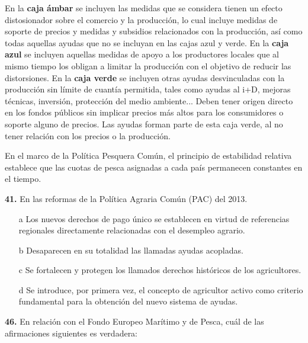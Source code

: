 \documentclass{nuevotema}
\begin{document}
En la \textbf{caja ámbar} se incluyen las medidas que se considera tienen un efecto distosionador sobre el comercio y la producción, lo cual incluye medidas de soporte de precios y medidas y subsidios relacionados con la producción, así como todas aquellas ayudas que no se incluyan en las cajas azul y verde. En la \textbf{caja azul} se incluyen aquellas medidas de apoyo a los productores locales que al mismo tiempo los obligan a limitar la producción con el objetivo de reducir las distorsiones. En la \textbf{caja verde} se incluyen otras ayudas desvinculadas con la producción sin límite de cuantía permitida, tales como ayudas al i+D, mejoras técnicas, inversión, protección del medio ambiente... Deben tener origen directo en los fondos públicos sin implicar precios más altos para los consumidores o soporte alguno de precios. Las ayudas  forman parte de esta caja verde, al no tener relación con los precios o la producción.


En el marco de la Política Pesquera Común, el principio de estabilidad relativa establece que las cuotas de pesca asignadas a cada país permanecen constantes en el tiempo. 

\preguntas

\textbf{41.} En las reformas de la Política Agraria Común (PAC) del 2013.

\begin{itemize}
	\item[a] Los nuevos derechos de pago único se establecen en virtud de referencias regionales directamente relacionadas con el desempleo agrario.
	\item[b] Desaparecen en su totalidad las llamadas ayudas acopladas.
	\item[c] Se fortalecen y protegen los llamados derechos históricos de los agricultores.
	\item[d] Se introduce, por primera vez, el concepto de agricultor activo como criterio fundamental para la obtención del nuevo sistema de ayudas.
\end{itemize}


\textbf{46.} En relación con el Fondo Europeo Marítimo y de Pesca, cuál de las afirmaciones siguientes es verdadera:
\end{document}
